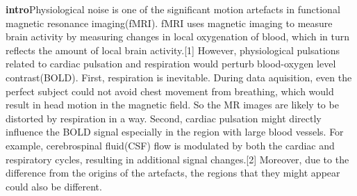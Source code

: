 \textbf{intro}Physiological noise is one of the significant motion artefacts in functional magnetic resonance imaging(fMRI).
fMRI uses magnetic imaging to measure brain activity by measuring changes in local oxygenation of blood, which in turn reflects the amount of local brain activity.[1] However, physiological pulsations related to cardiac pulsation and respiration would perturb blood-oxygen level contrast(BOLD). First, respiration is inevitable. During data aquisition, even the perfect subject could not avoid chest movement from breathing, which would result in head motion in the magnetic field. So the MR images are likely to be distorted by respiration in a way. Second, cardiac pulsation might directly influence the BOLD signal especially in the region with large blood vessels. For example, cerebrospinal fluid(CSF) flow is modulated by both the cardiac and respiratory cycles, resulting in additional signal changes.[2] Moreover, due to the difference from the origins of the artefacts, the regions that they might appear could also be different.